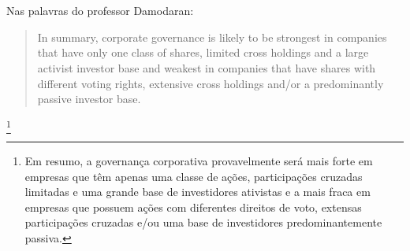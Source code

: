 \\~\\
Nas palavras do professor Damodaran:
\begin{quote}
In summary, corporate governance is likely to be strongest in companies that have only
one class of shares, limited cross holdings and a large activist investor base and weakest
in companies that have shares with different voting rights, extensive cross holdings
and/or a predominantly passive investor base.
\end{quote}\footnote{Em resumo, a governança corporativa provavelmente será mais forte em empresas que têm apenas
uma classe de ações, participações cruzadas limitadas e uma grande base de investidores ativistas e a mais fraca
em empresas que possuem ações com diferentes direitos de voto, extensas participações cruzadas
e/ou uma base de investidores predominantemente passiva.
}
